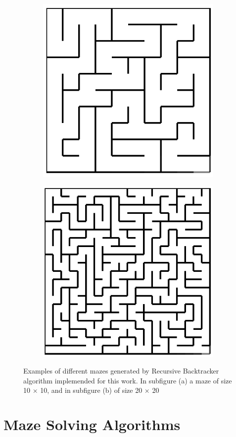 \begin{figure}[!h]
    \centering
    \begin{subfigure}{.45\textwidth}
    \centering
    \includegraphics[width=.6\linewidth]{recursive1010.png}
    \caption{}
    \label{fig:sub1}
    \end{subfigure}
    \begin{subfigure}{.45\textwidth}
    \centering
    \includegraphics[width=.6\linewidth]{recursive2020.png}
    \caption{}
    \label{fig:sub2}
    \end{subfigure}
    \caption{Examples of different mazes generated by Recursive Backtracker algorithm implemended for this work. In subfigure (a) a maze of size 10 $\times$ 10, and in subfigure (b) of size 20 $\times$ 20}
    \label{fig:test}
    \end{figure}
\section{Maze Solving Algorithms}
